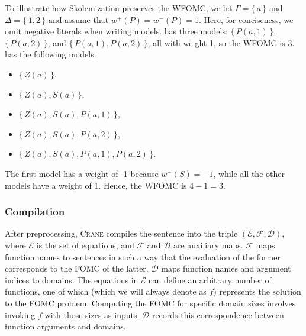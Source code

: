 \documentclass[a4paper,UKenglish,cleveref,autoref]{lipics-v2021}
\begin{document}
To illustrate how Skolemization preserves the WFOMC, we let $\Gamma = \{\,a\,\}$
and $\Delta = \{\,1, 2\,\}$ and assume that $w^+(P) = w^-(P) = 1$. Here, for
conciseness, we omit negative literals when writing models.
 has three models: $\{\,P(a, 1)\,\}$,
$\{\,P(a, 2)\,\}$, and $\{\,P(a, 1), P(a, 2)\,\}$, all with weight 1, so the
WFOMC is 3.  has the following models:
\begin{itemize}
  \item $\{\,Z(a)\,\}$,
  \item $\{\,Z(a), S(a)\,\}$,
  \item $\{\,Z(a), S(a), P(a, 1)\,\}$,
  \item $\{\,Z(a), S(a), P(a, 2)\,\}$,
  \item $\{\,Z(a), S(a), P(a, 1), P(a, 2)\,\}$.
\end{itemize}
The first model has a weight of -1 because $w^-(S) = -1$, while all the other
models have a weight of 1. Hence, the WFOMC is $4 - 1 = 3$.

\subsubsection{Compilation}\label{sec:compilation}

After preprocessing, \textsc{Crane} compiles the sentence into the triple
$(\mathcal{E}, \mathcal{F}, \mathcal{D})$, where $\mathcal{E}$ is the set of
equations, and $\mathcal{F}$ and $\mathcal{D}$ are auxiliary maps. $\mathcal{F}$
maps function names to sentences in such a way that the evaluation of the former
corresponds to the FOMC of the latter. $\mathcal{D}$ maps function names and
argument indices to domains. The equations in $\mathcal{E}$ can define an
arbitrary number of functions, one of which (which we will always denote as $f$)
represents the solution to the FOMC problem. Computing the FOMC for specific
domain sizes involves invoking $f$ with those sizes as inputs. $\mathcal{D}$
records this correspondence between function arguments and domains.
\end{document}
